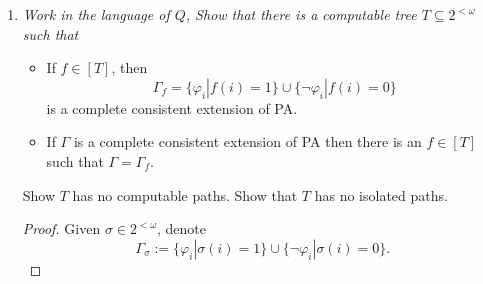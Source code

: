 \documentclass{article}
\begin{document}
\begin{enumerate}[label={\bf Q\arabic*:}]
\begin{proof}
      Observe that all checks we performed to determine if $\tau\in p$ are
      algorithmic in nature: checking if $\tau\in T$ is algorithmic since
      $T$ is computable; checking if $\tau$ is an initial segment or an
      extension of $\sigma$ is also algorithmic since $\sigma$ and $\tau$
      are finite in length; checking if $p$ extends $\tau$ as described in
      the previous paragraph is also recursive in nature and thus
      algorithmic. Thus by Church-Turing thesis, $p$ is computable. \\

      Assume $T$ contains a path $p$ that is not isolated. Then we can find
      countably infinite distinct paths $\{q_n:n\in\omega\}$ in $T$
      different from $p$ as follows: Staring at $n=0$, since the empty
      string does not isolate $p$, there must be a path $q_0\in T$ that is
      distinct from $p$. For $n+1$, let $\sigma_n\in2^{<\omega}$ denote the
      longest initial segment shared by $p$ and $q_n$. Note that $\sigma_n$
      exists since $p$ and $q_n$ are distinct. Also from construction,
      $|\sigma_n|$ is strictly increasing in $n$. Then let $q_{n+1}$ be a
      path in $T$ that extends $p\restriction(|\sigma_n|+1)$ and that is
      distinct from $p$. Such a $q_{n+1}$ must exist since $\sigma_n$ does
      not isolate $p$. Also, note $q_{n+1}$ will be distinct from
      $\{q_0,\ldots,q_n\}$ from construction. Thus $[T]$ is infinite.
    \end{proof}

  \item \it Work in the language of $Q$, Show that there is a computable
    tree $T\subseteq2^{<\omega}$ such that
    \begin{itemize}
      \item If $f\in[T]$, then
        \[\Gamma_f =\{\varphi_i| f(i)=1\} \cup\{\neg\varphi_i| f(i)=0\}\]
        is a complete consistent extension of PA.

      \item If $\Gamma$ is a complete consistent extension of PA then there
        is an $f\in[T]$ such that $\Gamma=\Gamma_f$.
    \end{itemize}

    Show $T$ has no computable paths. Show that $T$ has no isolated paths.

    \begin{proof}
      Given $\sigma\in2^{<\omega}$, denote
      \[\Gamma_\sigma:= \{\varphi_i| \sigma(i)=1\} \cup\{\neg\varphi_i|
      \sigma(i)=0\}.\]


\end{proof}
\end{enumerate}
\end{document}

